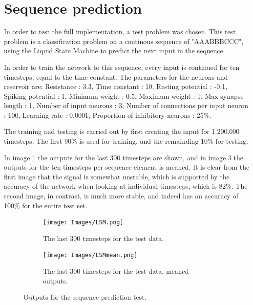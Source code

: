\section{Sequence prediction}

In order to test the full implementation, a test problem was chosen. This test problem is a classification problem on a continous sequence of "AAABBBCCC", using the Liquid State Machine to predict the next input in the sequence.

In order to train the network to this sequence, every input is continued for ten timesteps, equal to the time constant. The parameters for the neurons and reservoir are; Resistance : 3.3, Time constant : 10, Resting potential : -0.1, Spiking potential : 1, Minimum weight : 0.5, Maximum weight : 1, Max synapse length : 1, Number of input neurons : 3, Number of connections per input neuron : 100, Learning rate : 0.0001, Proportion of inhibitory neurons : 25\%.

The training and testing is carried out by first creating the input for 1.200.000 timesteps. The first 90\% is used for training, and the remainding 10\% for testing.

In image \ref{fig:result} the outputs for the last 300 timesteps are shown, and in image \ref{fig:resultMean} the outputs for the ten timesteps per sequence element is meaned. It is clear from the first image that the signal is somewhat unstable, which is supported by the accuracy of the network when looking at individual timesteps, which is 82\%. The second image, in contrast, is much more stable, and indeed has an accuracy of 100\% for the entire test set.

\begin{figure}
    \centering
    \begin{subfigure}[b]{0.4\textwidth}
        \texttt{[image: Images/LSM.png]}
        \caption{The last 300 timesteps for the test data.}
    \label{fig:result}
    \end{subfigure}
    \begin{subfigure}[b]{0.4\textwidth}
        \texttt{[image: Images/LSMmean.png]}
        \caption{The last 300 timesteps for the test data, meaned outputs.}
    \label{fig:resultMean}
    \end{subfigure}
    \caption{Outputs for the sequence prediction test.}
\end{figure}










